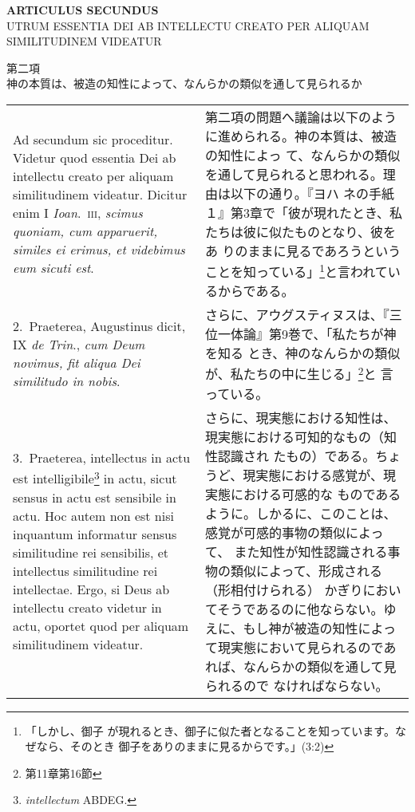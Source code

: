 \documentclass[10pt]{jsarticle} %
\begin{document}
\newpage
{}

\begin{center}
{\Large {\bf ARTICULUS SECUNDUS}}\\
{\large UTRUM ESSENTIA DEI AB INTELLECTU CREATO PER ALIQUAM
 SIMILITUDINEM VIDEATUR} 

{\large 第二項\\
神の本質は、被造の知性によって、なんらかの類似を通して見られるか}
\end{center}

\begin{longtable}{p{21em}p{21em}}
{\sc Ad secundum sic proceditur}. Videtur quod essentia Dei ab
 intellectu creato per aliquam similitudinem videatur. Dicitur enim I
 {\itshape Ioan}.~{\scshape iii}, {\it scimus quoniam, cum apparuerit,
 similes ei erimus, et videbimus eum sicuti est}.

&

第二項の問題へ議論は以下のように進められる。神の本質は、被造の知性によっ
て、なんらかの類似を通して見られると思われる。理由は以下の通り。『ヨハ
ネの手紙１』第3章で「彼が現れたとき、私たちは彼に似たものとなり、彼をあ
りのままに見るであろうということを知っている」\footnote{「しかし、御子
が現れるとき、御子に似た者となることを知っています。なぜなら、そのとき
御子をありのままに見るからです。」(3:2) }と言われているからである。


\\


2.~{\sc  Praeterea}, Augustinus dicit, IX {\it de Trin}., {\it cum
Deum novimus, fit aliqua Dei similitudo in nobis}.

&

さらに、アウグスティヌスは、『三位一体論』第9巻で、「私たちが神を知る
とき、神のなんらかの類似が、私たちの中に生じる」\footnote{第11章第16節}と
言っている。

\\

3.~{\sc Praeterea}, intellectus in actu est
intelligibile\footnote{{\it intellectum} ABDEG.} in actu, sicut sensus
in actu est sensibile in actu. Hoc autem non est nisi inquantum
informatur sensus similitudine rei sensibilis, et intellectus
similitudine rei intellectae. Ergo, si Deus ab intellectu creato
videtur in actu, oportet quod per aliquam similitudinem videatur.

&

さらに、現実態における知性は、現実態における可知的なもの（知性認識され
たもの）である。ちょうど、現実態における感覚が、現実態における可感的な
ものであるように。しかるに、このことは、感覚が可感的事物の類似によって、
また知性が知性認識される事物の類似によって、形成される（形相付けられる）
かぎりにおいてそうであるのに他ならない。ゆえに、もし神が被造の知性によっ
て現実態において見られるのであれば、なんらかの類似を通して見られるので
なければならない。


\end{longtable}
\end{document}
